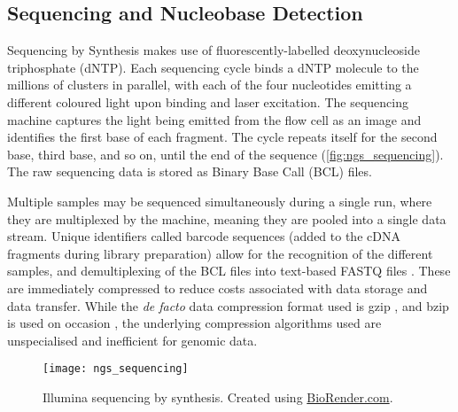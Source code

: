 \subsection{Sequencing and Nucleobase Detection}
Sequencing by Synthesis \citep{illumina2010} makes use of fluorescently-labelled deoxynucleoside triphosphate (dNTP). Each sequencing cycle binds a dNTP molecule to the millions of clusters in parallel, with each of the four nucleotides emitting a different coloured light upon binding and laser excitation. The sequencing machine captures the light being emitted from the flow cell as an image and identifies the first base of each fragment. The cycle repeats itself for the second base, third base, and so on, until the end of the sequence (\autoref{fig:ngs_sequencing}). The raw sequencing data is stored as Binary Base Call (BCL) files.

Multiple samples may be sequenced simultaneously during a single run, where they are multiplexed by the machine, meaning they are pooled into a single data stream. Unique identifiers called barcode sequences (added to the cDNA fragments during library preparation) allow for the recognition of the different samples, and demultiplexing of the BCL files into text-based FASTQ files \citep{cock2010sanger}. These are immediately compressed to reduce costs associated with data storage and data transfer. While the \textit{de facto} data compression format used is gzip \citep{deutsch1996gzip}, and bzip is used on occasion \citep{seward1996bzip2}, the underlying compression algorithms used are unspecialised and inefficient for genomic data.

\begin{figure}[!h]
    \centering
    \texttt{[image: ngs\_sequencing]}
    \caption[Sequencing by synthesis]{Illumina sequencing by synthesis. Created using \href{https://biorender.com/}{BioRender.com}. } 
    \label{fig:ngs_sequencing}
\end{figure}





